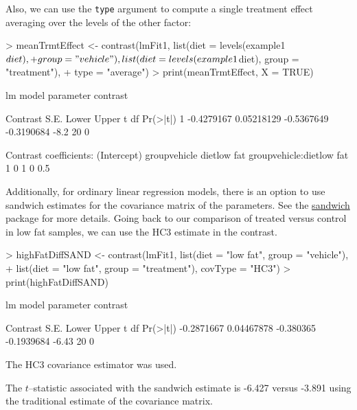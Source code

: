 \documentclass[12pt]{article}
\begin{document}
Also, we can use the \texttt{type} argument to compute a single treatment effect averaging over the levels of the other factor:

{\small
\begin{Schunk}
\begin{Sinput}
> meanTrmtEffect <- contrast(lmFit1, list(diet = levels(example1$diet), 
+     group = "vehicle"), list(diet = levels(example1$diet), group = "treatment"), 
+     type = "average")
> print(meanTrmtEffect, X = TRUE)
\end{Sinput}
\begin{Soutput}
lm model parameter contrast

    Contrast       S.E.      Lower      Upper    t df Pr(>|t|)
1 -0.4279167 0.05218129 -0.5367649 -0.3190684 -8.2 20        0

Contrast coefficients:
  (Intercept) groupvehicle dietlow fat groupvehicle:dietlow fat
1           0            1           0                      0.5
\end{Soutput}
\end{Schunk}
}

Additionally, for ordinary linear regression models, there is an option to use sandwich estimates for the covariance matrix of the parameters. See the \href{http://cran.r-project.org/src/contrib/Descriptions/sandwich.html}{sandwich} package for more details. Going back to our comparison of treated versus control in low fat samples, we can use the HC3 estimate in the contrast.

{\small 
\begin{Schunk}
\begin{Sinput}
> highFatDiffSAND <- contrast(lmFit1, list(diet = "low fat", group = "vehicle"), 
+     list(diet = "low fat", group = "treatment"), covType = "HC3")
> print(highFatDiffSAND)
\end{Sinput}
\begin{Soutput}
lm model parameter contrast

   Contrast       S.E.     Lower      Upper     t df Pr(>|t|)
 -0.2871667 0.04467878 -0.380365 -0.1939684 -6.43 20        0

The HC3 covariance estimator was used.
\end{Soutput}
\end{Schunk}
}

The $t$--statistic associated with the sandwich estimate is -6.427 versus -3.891 using the traditional estimate of the covariance matrix.
\end{document}
